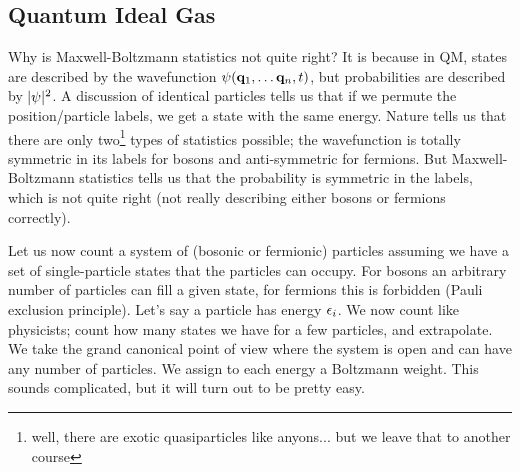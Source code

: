 \subsection{Quantum Ideal Gas}
Why is Maxwell-Boltzmann statistics not quite right? It is because in QM, states are described by the wavefunction $\psi(\mathbf{q}_1, \ldots \mathbf{q}_n, t)$, but probabilities are described by $\lvert \psi \rvert^2$. A discussion of identical particles tells us that if we permute the position/particle labels, we get a state with the same energy. Nature tells us that there are only two\footnote{well, there are exotic quasiparticles like anyons... but we leave that to another course} types of statistics possible; the wavefunction is totally symmetric in its labels for bosons and anti-symmetric for fermions. But Maxwell-Boltzmann statistics tells us that the probability is symmetric in the labels, which is not quite right (not really describing either bosons or fermions correctly).

Let us now count a system of (bosonic or fermionic) particles assuming we have a set of single-particle states that the particles can occupy. For bosons an arbitrary number of particles can fill a given state, for fermions this is forbidden (Pauli exclusion principle). Let's say a particle has energy $\epsilon_i$. We now count like physicists; count how many states we have for a few particles, and extrapolate. We take the grand canonical point of view where the system is open and can have any number of particles. We assign to each energy a Boltzmann weight. This sounds complicated, but it will turn out to be pretty easy.


